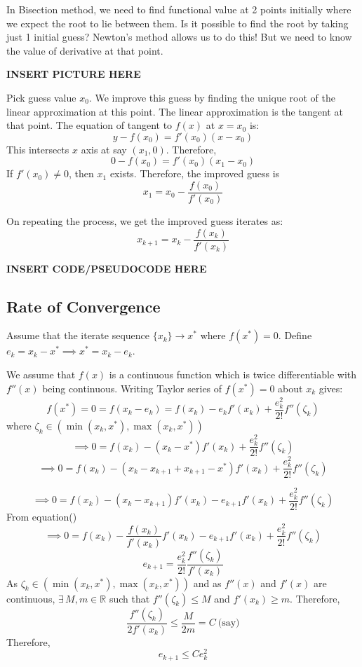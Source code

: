 \documentclass[
]{book}
\begin{document}
In Bisection method, we need to find functional value at 2 points initially where we expect the root to lie between them. Is it possible to find the root by taking just 1 initial guess? Newton's method allows us to do this! But we need to know the value of derivative at that point.

\textbf{INSERT PICTURE HERE}

Pick guess value \(x_0\). We improve this guess by finding the unique root of the linear approximation at this point. The linear approximation is the tangent at that point. The equation of tangent to \(f(x)\) at \(x=x_0\) is:
\[y-f(x_0) = f'(x_0) (x-x_0)\]
This intersects \(x\) axis at say \((x_1,0)\). Therefore,
\[0-f(x_0) =  f'(x_0) (x_1-x_0)\]
If \(f'(x_0)\neq 0\), then \(x_1\) exists. Therefore, the improved guess is
\begin{equation}
x_1 = x_0 - \frac{f(x_0)}{f'(x_0)}
\end{equation}

On repeating the process, we get the improved guess iterates as:
\begin{equation}
x_{k+1} = x_k - \frac{f(x_k)}{f'(x_k)}
\end{equation}

\textbf{INSERT CODE/PSEUDOCODE HERE}

\hypertarget{rate-of-convergence}{%
\subsection{Rate of Convergence}\label{rate-of-convergence}}

Assume that the iterate sequence \(\{x_k\}\to x^*\) where \(f(x^*)=0\).
Define \(e_k = x_k-x^* \implies x^*=x_k-e_k\).

We assume that \(f(x)\) is a continuous function which is twice differentiable with \(f''(x)\) being continuous. Writing Taylor series of \(f(x^*)=0\) about \(x_k\) gives:
\[f(x^*)=0= f(x_k-e_k) = f(x_k) - e_k f'(x_k)+\frac{e_k^2}{2!} f''(\zeta_k) \]
where \(\zeta_k \in (\min(x_k,x^*),\max(x_k,x^*))\)
\[\implies 0=f(x_k)-(x_k-x^*)f'(x_k)+\frac{e_k^2}{2!} f''(\zeta_k)\]
\[\implies 0 = f(x_k) - (x_k-x_{k+1}+x_{k+1}-x^*)f'(x_k) + \frac{e_k^2}{2!} f''(\zeta_k)\]

\[\implies 0 = f(x_k) - (x_k-x_{k+1}) f'(x_k) - e_{k+1} f'(x_k) +\frac{e_k^2}{2!} f''(\zeta_k)\]
From equation()
\[\implies 0 =f(x_k) - \frac{f(x_k)}{f'(x_k)}f'(x_k) - e_{k+1} f'(x_k) +\frac{e_k^2}{2!} f''(\zeta_k)\]
\[ e_{k+1} = \frac{e_k^2}{2!} \frac{f''(\zeta_k)}{f'(x_k)}\]
As \(\zeta_k \in (\min(x_k,x^*),\max(x_k,x^*))\) and as \(f''(x)\) and \(f'(x)\) are continuous, \(\exists\, M,m\in \mathbb{R}\) such that \(f''(\zeta_k) \le M\) and \(f'(x_k) \ge m\). Therefore,
\[\frac{f''(\zeta_k)}{2 f'(x_k)} \le \frac{M}{2m} = C \ \text{(say)}\]
Therefore,
\begin{equation}
e_{k+1} \le C e_k^2
\end{equation}
\end{document}
